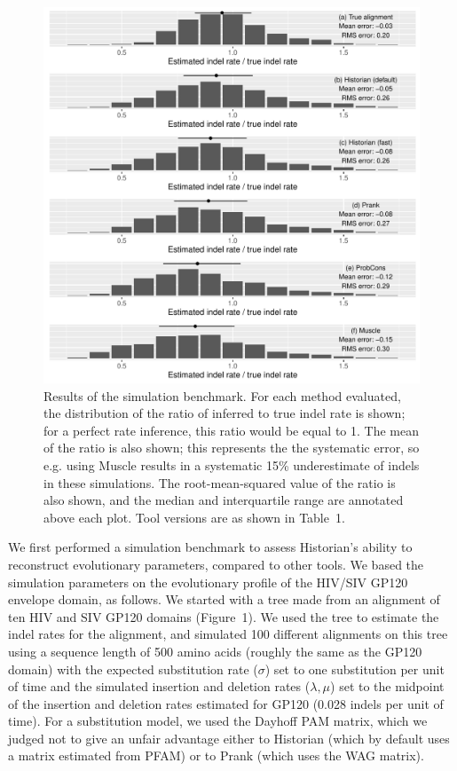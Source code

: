 \documentclass{bioinfo}
\begin{document}
\begin{figure}
  \includegraphics[width=\columnwidth]{sim/results.pdf}
  \caption{
    Results of the simulation benchmark.
    For each method evaluated, the distribution of the ratio of inferred to true
    indel rate is shown; for a perfect rate inference, this ratio would be equal to 1.
    The mean of the ratio is also shown; this represents the the systematic error,
    so e.g. using Muscle results in a systematic 15\% underestimate of indels
    in these simulations.
    The root-mean-squared value of the ratio is also shown,
    and the median and interquartile range are annotated above each plot.
    Tool versions are as shown in Table~1.
  }
\end{figure}

We first performed a simulation benchmark to assess Historian's ability to reconstruct evolutionary parameters,
compared to other tools.
We based the simulation parameters on the evolutionary profile of the HIV/SIV GP120 envelope domain, as follows.
We started with a tree made from an alignment of ten HIV and SIV GP120 domains (Figure~1).
We used the tree to estimate the indel rates for the alignment,
and simulated 100 different alignments on this tree
using a sequence length of 500 amino acids
(roughly the same as the GP120 domain)
with the expected substitution rate ($\sigma$) set to one substitution per unit of time
and the simulated insertion and deletion rates ($\lambda,\mu$)
set to the midpoint of the insertion and deletion rates
estimated for GP120 (0.028 indels per unit of time).
For a substitution model, we used the Dayhoff PAM matrix,
which we judged not to give an unfair advantage either to Historian
(which by default uses a matrix estimated from PFAM)
or to Prank (which uses the WAG matrix).
\end{document}
